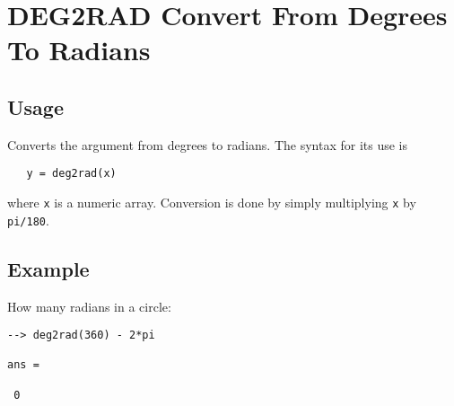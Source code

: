 \section{DEG2RAD Convert From Degrees To Radians}

\subsection{Usage}

Converts the argument from degrees to radians.  The
syntax for its use is
\begin{verbatim}
   y = deg2rad(x)
\end{verbatim}
where \verb|x| is a numeric array.  Conversion is done by
simply multiplying \verb|x| by \verb|pi/180|.
\subsection{Example}

How many radians in a circle:
\begin{verbatim}
--> deg2rad(360) - 2*pi

ans = 

 0 
\end{verbatim}
